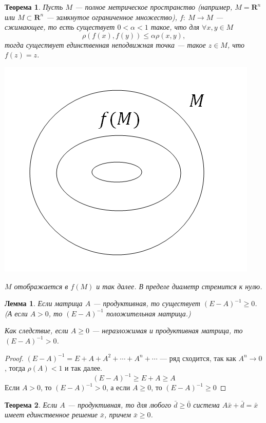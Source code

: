 \documentclass[12pt]{article}
\newtheorem*{theorem}{Теорема}
\newtheorem*{lemma}{Лемма}
\begin{document}
	\begin{theorem}
		Пусть $M$ --- полное метрическое пространство (например, $M=\textbf{R}^n$ или $M \subset \textbf{R}^n$ --- замкнутое ограниченное множество), $f:~M\to M$ --- сжимающее, то есть существует $0<\alpha <1$ такое, что для $\forall x, y \in M$
	$$\rho(f(x), f(y))\leqslant \alpha \rho(x, y),$$
	тогда существует единственная неподвижная точка --- такое $z\in M$, что $f(z)=z$.\\
	\begin{center}
		\includegraphics[scale=0.7]{l14_1.png}\\
	\end{center}
	$M$ отображается в $f(M)$ и так далее. В пределе диаметр стремится к нулю.
	\end{theorem}
	\begin{lemma}
		Если матрица $A$ --- продуктивная, то существует $(E-A)^{-1}\geqslant 0$. (А если $A>0$, то $(E-A)^{-1}$ положительная матрица.)
		
		Как следствие, если $A\geqslant 0$ --- неразложимая и продуктивная матрица, то $(E-A)^{-1}>0$.
	\end{lemma}
	\begin{proof}
		$(E-A)^{-1}=E+A+A^2+\cdots +A^n+\cdots$ --- ряд сходится, так как $A^n \to 0$, тогда $\rho(A)<1$ и так далее.\\
	$$(E-A)^{-1}\geqslant E+A \geqslant A$$
	Если $A>0$, то $(E-A)^{-1}>0$, а если $A\geqslant 0$, то $(E-A)^{-1}\geqslant 0$
	\end{proof}
	\begin{theorem}
		Если $A$ --- продуктивная, то для любого $\bar d \geqslant \bar 0$ система $A\bar x+\bar d=\bar x$ имеет единственное решение $\bar x$, причем $\bar x \geqslant 0$.
	\end{theorem}
\end{document}
